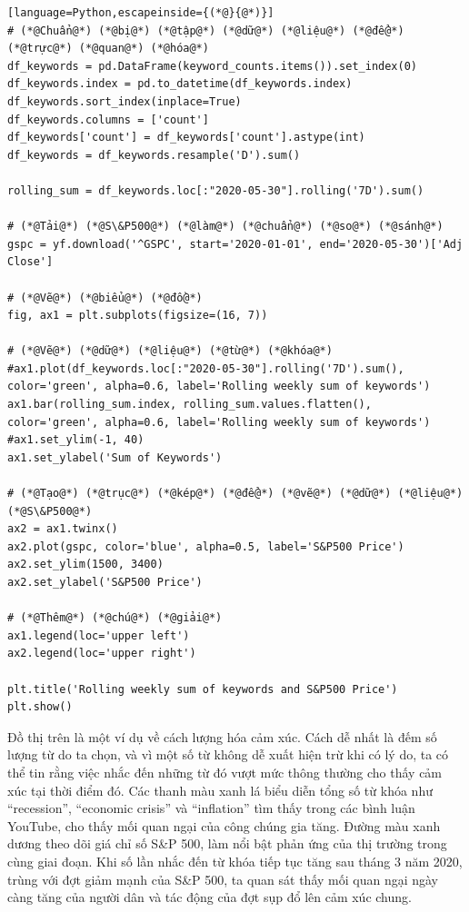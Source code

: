 \begin{lstlisting}[language=Python,escapeinside={(*@}{@*)}]
# (*@Chuẩn@*) (*@bị@*) (*@tập@*) (*@dữ@*) (*@liệu@*) (*@để@*) (*@trực@*) (*@quan@*) (*@hóa@*)
df_keywords = pd.DataFrame(keyword_counts.items()).set_index(0)
df_keywords.index = pd.to_datetime(df_keywords.index)
df_keywords.sort_index(inplace=True)
df_keywords.columns = ['count']
df_keywords['count'] = df_keywords['count'].astype(int)
df_keywords = df_keywords.resample('D').sum()

rolling_sum = df_keywords.loc[:"2020-05-30"].rolling('7D').sum()

# (*@Tải@*) (*@S\&P500@*) (*@làm@*) (*@chuẩn@*) (*@so@*) (*@sánh@*)
gspc = yf.download('^GSPC', start='2020-01-01', end='2020-05-30')['Adj Close']

# (*@Vẽ@*) (*@biểu@*) (*@đồ@*)
fig, ax1 = plt.subplots(figsize=(16, 7))

# (*@Vẽ@*) (*@dữ@*) (*@liệu@*) (*@từ@*) (*@khóa@*)
#ax1.plot(df_keywords.loc[:"2020-05-30"].rolling('7D').sum(), color='green', alpha=0.6, label='Rolling weekly sum of keywords')
ax1.bar(rolling_sum.index, rolling_sum.values.flatten(), color='green', alpha=0.6, label='Rolling weekly sum of keywords')
#ax1.set_ylim(-1, 40)
ax1.set_ylabel('Sum of Keywords')

# (*@Tạo@*) (*@trục@*) (*@kép@*) (*@để@*) (*@vẽ@*) (*@dữ@*) (*@liệu@*) (*@S\&P500@*)
ax2 = ax1.twinx()
ax2.plot(gspc, color='blue', alpha=0.5, label='S&P500 Price')
ax2.set_ylim(1500, 3400)
ax2.set_ylabel('S&P500 Price')

# (*@Thêm@*) (*@chú@*) (*@giải@*)
ax1.legend(loc='upper left')
ax2.legend(loc='upper right')

plt.title('Rolling weekly sum of keywords and S&P500 Price')
plt.show()
\end{lstlisting}

Đồ thị trên là một ví dụ về cách lượng hóa cảm xúc. Cách dễ nhất là đếm số lượng từ do ta chọn, và vì một số từ không dễ xuất hiện trừ khi có lý do, ta có thể tin rằng việc nhắc đến những từ đó vượt mức thông thường cho thấy cảm xúc tại thời điểm đó. Các thanh màu xanh lá biểu diễn tổng số từ khóa như ``recession'', ``economic crisis'' và ``inflation'' tìm thấy trong các bình luận YouTube, cho thấy mối quan ngại của công chúng gia tăng. Đường màu xanh dương theo dõi giá chỉ số S\&P 500, làm nổi bật phản ứng của thị trường trong cùng giai đoạn. Khi số lần nhắc đến từ khóa tiếp tục tăng sau tháng 3 năm 2020, trùng với đợt giảm mạnh của S\&P 500, ta quan sát thấy mối quan ngại ngày càng tăng của người dân và tác động của đợt sụp đổ lên cảm xúc chung.

